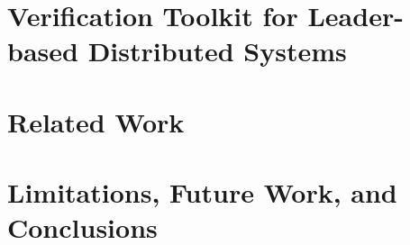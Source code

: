 \documentclass[letterpaper,11pt]{yalephd}
\begin{document}
\chapter{Verification Toolkit for Leader-based Distributed Systems }
\label{chapter:witness-passing}




%
%
%
%
%
%
%
%
%

%
%

\chapter{Related Work} 
\label{chapter:related}


\chapter{Limitations, Future Work, and Conclusions}
\label{chapter:conclusion}



\backmatter


\end{document}
